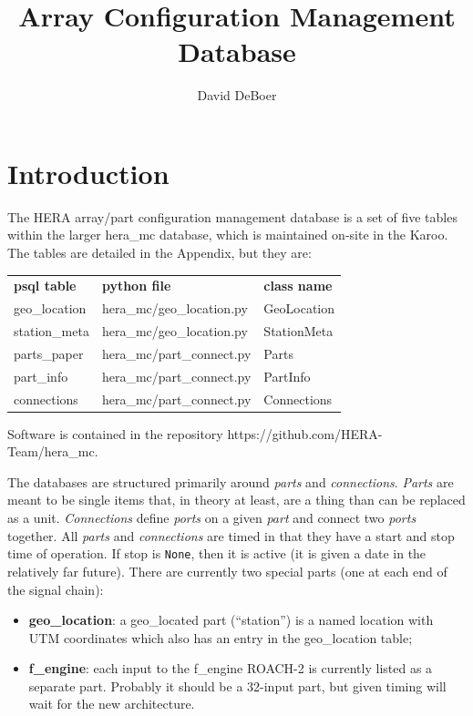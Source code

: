 \documentclass{article}
\begin{document}
\author{David DeBoer}
\title{Array Configuration Management Database}
\maketitle

\section{Introduction}
The HERA array/part configuration management database is a set of five tables within the larger hera\_mc database, which is maintained on-site in the Karoo.  The tables are detailed in the Appendix, 
but they are:  
\begin{tabular}{l l l}
         {\bf psql table} & {\bf python file}  &  {\bf class name} \\
	geo\_location 	& hera\_mc/geo\_location.py & GeoLocation \\
	station\_meta 	& hera\_mc/geo\_location.py & StationMeta \\
	parts\_paper 	& hera\_mc/part\_connect.py & Parts \\
	part\_info 	         & hera\_mc/part\_connect.py & PartInfo \\
	connections 	& hera\_mc/part\_connect.py & Connections \\
\end{tabular}

Software is contained in the repository https://github.com/HERA-Team/hera\_mc.

The databases are structured primarily around {\em parts} and {\em connections}.  {\em Parts} are meant to be single items that, in theory at least, are a thing than can be replaced as a unit.  
{\em Connections} define {\em ports} on a given {\em part} and connect two {\em ports} together.  All {\em parts} and {\em connections} are timed in that they have a start and stop time of operation.  If stop is {\tt None}, then it is active (it is given a date in the relatively far future).  There are currently two special parts (one at each end of the signal chain):
\begin{itemize}
	\item {\bf geo\_location}: a geo\_located part (``station'') is a named location with UTM coordinates which also has an entry in the geo\_location table;
	\item {\bf f\_engine}:  each input to the f\_engine ROACH-2 is currently listed as a separate part.  Probably it should be a 32-input part, but given timing will wait for the new architecture.
\end{itemize}
\end{document}
